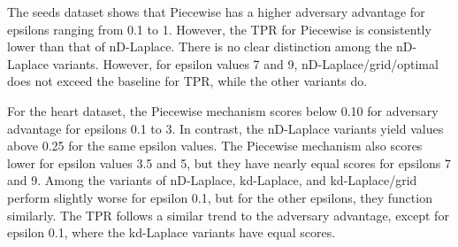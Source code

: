 {  The seeds dataset shows that Piecewise has a higher adversary advantage for epsilons ranging from 0.1 to 1.
  However, the TPR for Piecewise is consistently lower than that of nD-Laplace. There is no clear distinction among the nD-Laplace variants.
  However, for epsilon values 7 and 9, nD-Laplace/grid/optimal does not exceed the baseline for TPR, while the other variants do.

  For the heart dataset, the Piecewise mechanism scores below 0.10 for adversary advantage for epsilons 0.1 to 3.
  In contrast, the nD-Laplace variants yield values above 0.25 for the same epsilon values.
  The Piecewise mechanism also scores lower for epsilon values 3.5 and 5, but they have nearly equal scores for epsilons 7 and 9.
  Among the variants of nD-Laplace, kd-Laplace, and kd-Laplace/grid perform slightly worse for epsilon 0.1, but for the other epsilons, they function similarly.
  The TPR follows a similar trend to the adversary advantage, except for epsilon 0.1, where the kd-Laplace variants have equal scores.

  \newpage

}
